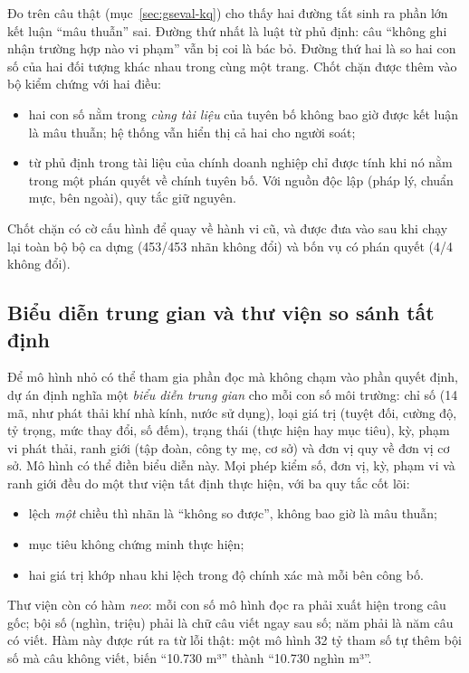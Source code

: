 Đo trên câu thật (mục~\ref{sec:gseval-kq}) cho thấy hai đường tắt sinh ra phần lớn kết luận “mâu thuẫn” sai. Đường thứ nhất là luật từ phủ định: câu “không ghi nhận trường hợp nào vi phạm” vẫn bị coi là bác bỏ. Đường thứ hai là so hai con số của hai đối tượng khác nhau trong cùng một trang. Chốt chặn được thêm vào bộ kiểm chứng với hai điều:
\begin{itemize}
\item hai con số nằm trong \emph{cùng tài liệu} của tuyên bố không bao giờ được kết luận là mâu thuẫn; hệ thống vẫn hiển thị cả hai cho người soát;
\item từ phủ định trong tài liệu của chính doanh nghiệp chỉ được tính khi nó nằm trong một phán quyết về chính tuyên bố. Với nguồn độc lập (pháp lý, chuẩn mực, bên ngoài), quy tắc giữ nguyên.
\end{itemize}
Chốt chặn có cờ cấu hình để quay về hành vi cũ, và được đưa vào sau khi chạy lại toàn bộ bộ ca dựng (453/453 nhãn không đổi) và bốn vụ có phán quyết (4/4 không đổi).

\subsection{Biểu diễn trung gian và thư viện so sánh tất định}

Để mô hình nhỏ có thể tham gia phần đọc mà không chạm vào phần quyết định, dự án định nghĩa một \emph{biểu diễn trung gian} cho mỗi con số môi trường: chỉ số (14 mã, như phát thải khí nhà kính, nước sử dụng), loại giá trị (tuyệt đối, cường độ, tỷ trọng, mức thay đổi, số đếm), trạng thái (thực hiện hay mục tiêu), kỳ, phạm vi phát thải, ranh giới (tập đoàn, công ty mẹ, cơ sở) và đơn vị quy về đơn vị cơ sở. Mô hình có thể điền biểu diễn này. Mọi phép kiểm số, đơn vị, kỳ, phạm vi và ranh giới đều do một thư viện tất định thực hiện, với ba quy tắc cốt lõi:
\begin{itemize}
\item lệch \emph{một} chiều thì nhãn là “không so được”, không bao giờ là mâu thuẫn;
\item mục tiêu không chứng minh thực hiện;
\item hai giá trị khớp nhau khi lệch trong độ chính xác mà mỗi bên công bố.
\end{itemize}
Thư viện còn có hàm \emph{neo}: mỗi con số mô hình đọc ra phải xuất hiện trong câu gốc; bội số (nghìn, triệu) phải là chữ câu viết ngay sau số; năm phải là năm câu có viết. Hàm này được rút ra từ lỗi thật: một mô hình 32 tỷ tham số tự thêm bội số mà câu không viết, biến “10.730 m³” thành “10.730 nghìn m³”.

